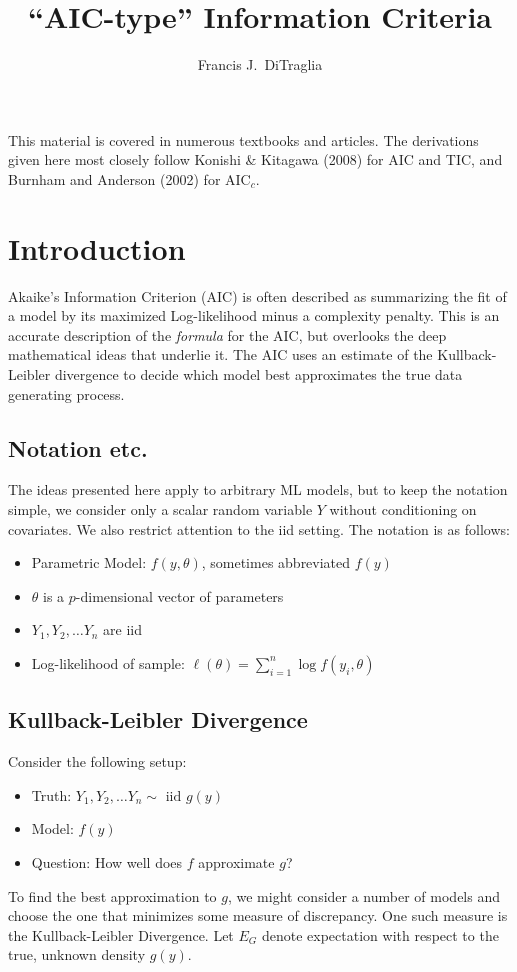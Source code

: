 \documentclass[12pt]{article}
\theoremstyle{definition}
\begin{document}
\title{``AIC-type'' Information Criteria}

\author{Francis J.\ DiTraglia}

\maketitle 


This material is covered in numerous textbooks and articles. The derivations given here most closely follow Konishi \& Kitagawa (2008) for AIC and TIC, and Burnham and Anderson (2002) for $\mbox{AIC}_c$.  


\section{Introduction}
Akaike's Information Criterion (AIC) is often described as summarizing the fit of a model by its maximized Log-likelihood minus a complexity penalty. This is an accurate description of the \emph{formula} for the AIC, but overlooks the deep mathematical ideas that underlie it. The AIC uses an estimate of the Kullback-Leibler divergence to decide which model best approximates the true data generating process.


\subsection{Notation etc.}
The ideas presented here apply to arbitrary ML models, but to keep the notation simple, we consider only a scalar random variable $Y$ without conditioning on covariates. We also restrict attention to the iid setting.  The notation is as follows:
		\begin{itemize}
			\item Parametric Model: $f\left(y,\theta\right)$, sometimes abbreviated $f(y)$
			\item $\theta$ is a $p$-dimensional vector of parameters
			\item $Y_1, Y_2, \hdots Y_n$ are iid 
			\item Log-likelihood of sample: $\ell(\theta) = \sum_{i=1}^n \log{f\left(y_i,\theta\right)}$
		\end{itemize}


\subsection{Kullback-Leibler Divergence}
Consider the following setup:
	\begin{itemize}
		\item Truth: $Y_1, Y_2, \hdots Y_n \sim \mbox{ iid } g(y)$
		\item Model: $f(y)$
		\item Question: How well does $f$ approximate $g$?
	\end{itemize}
To find the best approximation to $g$, we might consider a number of models and choose the one that minimizes some measure of discrepancy. One such measure is the Kullback-Leibler Divergence. Let $E_G$ denote expectation with respect to the true, unknown density $g(y)$.
\end{document}
